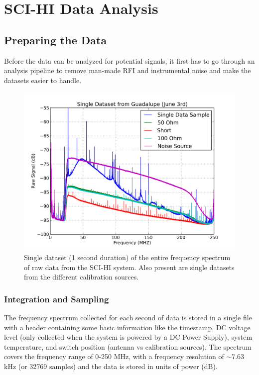 \chapter{SCI-HI Data Analysis}\label{Ch:Data}

\section{Preparing the Data}

Before the data can be analyzed for potential signals, it first has to go through an analysis pipeline to remove man-made RFI and instrumental noise and make the datasets easier to handle. 

\begin{figure}[htb]
\begin{center}
\includegraphics[width=0.9\linewidth]{Data_analysis/figures/single_raw_guad_june03.png}
\caption{Single dataset (1 second duration) of the entire frequency spectrum of raw data from the SCI-HI system. Also present are single datasets from the different calibration sources. }
\label{Fig:raw_data}
\end{center}
\end{figure}

\subsection{Integration and Sampling}\label{Sec:int}

The frequency spectrum collected for each second of data is stored in a single file with a header containing some basic information like the timestamp, DC voltage level (only collected when the system is powered by a DC Power Supply), system temperature, and switch position (antenna vs calibration sources). The spectrum covers the frequency range of 0-250 MHz, with a frequency resolution of $\sim 7.63$ kHz (or 32769 samples) and the data is stored in units of power (dB).

